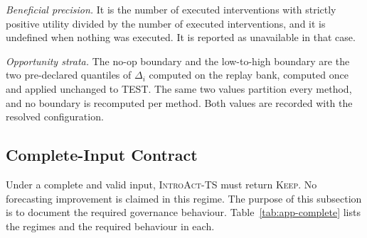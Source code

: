 \documentclass{article}
\newcommand{\introact}{\textsc{IntroAct-TS}}
\begin{document}
\emph{Beneficial precision.} It is the number of executed interventions with strictly positive
utility divided by the number of executed interventions, and it is undefined when nothing was
executed. It is reported as unavailable in that case.

\emph{Opportunity strata.} The no-op boundary and the low-to-high boundary are the two
pre-declared quantiles of $\Delta_i$ computed on the replay bank, computed once and applied
unchanged to TEST. The same two values partition every method, and no boundary is recomputed
per method. Both values are recorded with the resolved configuration.

\subsection{Complete-Input Contract}
\label{app:contract}
Under a complete and valid input, \introact{} must return \textsc{Keep}. No forecasting
improvement is claimed in this regime. The purpose of this subsection is to document the
required governance behaviour. Table~\ref{tab:app-complete} lists the
regimes and the required behaviour in each.

\begin{table}[htbp]
  \caption{Governance contract by input regime. The complete-input rows are contract
  statements and not accuracy results. The expected behaviour there is a no-op, and a non-no-op
  would violate the input-preservation requirement.}
  \label{tab:app-complete}
  \centering
  \small
  \setlength{\tabcolsep}{4pt}
\end{table}
\end{document}
